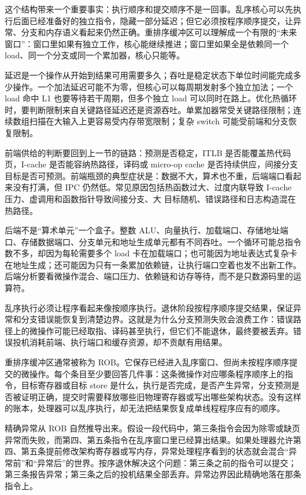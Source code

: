 这个结构带来一个重要事实：执行顺序和提交顺序不是一回事。乱序核心可以先执行后面已经准备好的独立指令，隐藏一部分延迟；但它必须按程序顺序提交，让异常、分支和内存语义看起来仍然正确。重排序缓冲区可以理解成一个有限的“未来窗口”：窗口里如果有独立工作，核心能继续推进；窗口里如果全是依赖同一个 load、同一个分支或同一个累加器，核心只能等。

延迟是一个操作从开始到结果可用需要多久；吞吐是稳定状态下单位时间能完成多少操作。一个加法延迟可能不为零，但核心可以每周期发射多个独立加法；一个 load 命中 L1 也要等待若干周期，但多个独立 load 可以同时在路上。优化热循环时，要判断限制来自关键路径延迟还是资源吞吐。单累加器常受关键路径限制；连续数组扫描在大输入上更容易受内存带宽限制；复杂 switch 可能受前端和分支恢复限制。

前端供给的判断要回到上一节的链路：预测是否稳定，ITLB 是否能覆盖热代码页，I-cache 是否能容纳热路径，译码或 micro-op cache 是否持续供应，间接分支目标是否可预测。前端瓶颈的典型症状是：数据不大，算术也不重，后端端口看起来没有打满，但 IPC 仍然低。常见原因包括热函数过大、过度内联导致 I-cache 压力、虚调用和函数指针导致间接分支、大  目标随机、错误路径和日志构造混在热路径。

后端不是“算术单元”一个盒子。整数 ALU、向量执行、加载端口、存储地址端口、存储数据端口、分支单元和地址生成单元都有不同吞吐。一个循环可能总指令数不多，却因为每轮需要多个 load 卡在加载端口；也可能因为地址表达式复杂卡在地址生成；还可能因为只有一条累加依赖链，让执行端口空着也发不出新工作。后端分析要看微操作混合、端口压力、依赖链和访存等待，而不是只数源码里的运算符。

乱序执行必须让程序看起来像按顺序执行。退休阶段按程序顺序提交结果，保证异常和分支错误能恢复到清楚边界。这就是为什么分支预测失败会浪费工作：错误路径上的微操作可能已经取指、译码甚至执行，但它们不能退休，最终要被丢弃。错误投机消耗前端、执行端口和缓存资源，却不贡献有用结果。

重排序缓冲区通常被称为 ROB。它保存已经进入乱序窗口、但尚未按程序顺序提交的微操作。每个条目至少要回答几件事：这条微操作对应哪条程序顺序上的指令，目标寄存器或目标 store 是什么，执行是否完成，是否产生异常，分支预测是否被证明正确，提交时需要释放哪些旧物理寄存器或写出哪些架构状态。没有这样的账本，处理器可以乱序执行，却无法把结果恢复成单线程程序应有的顺序。

精确异常从 ROB 自然推导出来。假设一段代码中，第三条指令会因为除零或缺页异常而失败，而第四、第五条指令在乱序窗口里已经算出结果。如果处理器允许第四、第五条提前修改架构寄存器或写内存，异常处理程序看到的状态就会混合“异常前”和“异常后”的世界。按序退休解决这个问题：第三条之前的指令可以提交；第三条报告异常；第三条之后的投机结果全部丢弃。异常边界因此精确地落在那条指令上。

